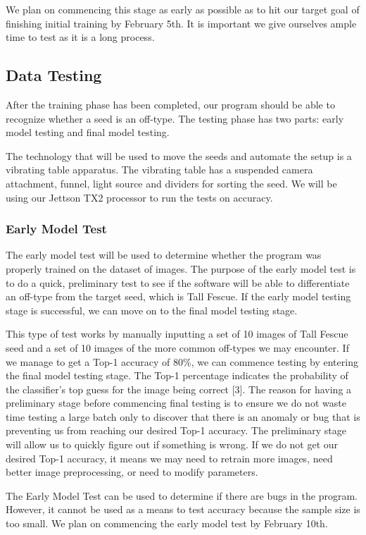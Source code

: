 \documentclass[onecolumn, draftclsnofoot,10pt, compsoc]{IEEEtran}
\begin{document}
We plan on commencing this stage as early as possible as to hit our target goal of finishing initial training by February 5th. It is important we give ourselves ample time to test as it is a long process. 

\subsection{Data Testing}
After the training phase has been completed, our program should be able to recognize whether a seed is an off-type. The testing phase has two parts: early model testing and final model testing. 


The technology that will be used to move the seeds and automate the setup is a vibrating table apparatus. The vibrating table has a suspended camera attachment, funnel, light source and dividers for sorting the seed. We will be using our Jettson TX2 processor to run the tests on accuracy. 

\subsubsection{Early Model Test}
The early model test will be used to determine whether the program was properly trained on the dataset of images. The purpose of the early model test is to do a quick, preliminary test to see if the software will be able to differentiate an off-type from the target seed, which is Tall Fescue. If the early model testing stage is successful, we can move on to the final model testing stage. 

This type of test works by manually inputting a set of 10 images of Tall Fescue seed and a set of 10 images of the more common off-types we may encounter. If we manage to get a Top-1 accuracy of 80\%, we can commence testing by entering the final model testing stage. The Top-1 percentage indicates the probability of the classifier’s top guess for the image being correct [3]. The reason for having a preliminary stage before commencing final testing is to ensure we do not waste time testing a large batch only to discover that there is an anomaly or bug that is preventing us from reaching our desired Top-1 accuracy. The preliminary stage will allow us to quickly figure out if something is wrong. If we do not get our desired Top-1 accuracy, it means we may need to retrain more images, need better image preprocessing, or need to modify parameters.  

The Early Model Test can be used to determine if there are bugs in the program. However, it cannot be used as a means to test accuracy because the sample size is too small. We plan on commencing the early model test by February 10th.  
\end{document}
